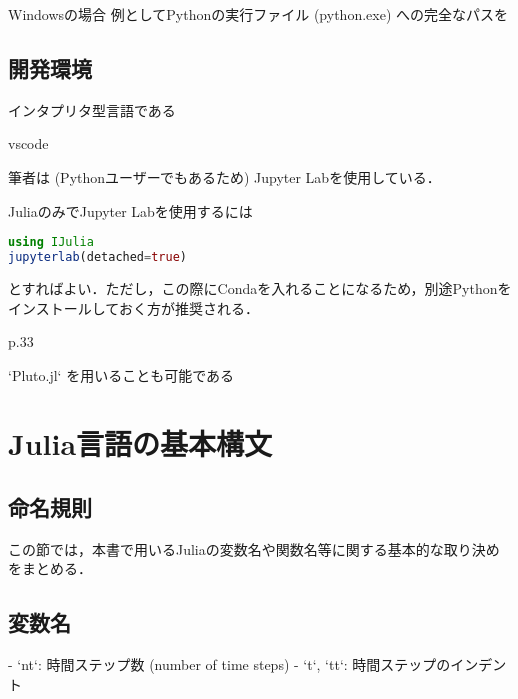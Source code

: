 \documentclass[titlepage]{ltjsbook}
\begin{document}
Windowsの場合
例としてPythonの実行ファイル (python.exe) への完全なパスを


\subsection{開発環境}

インタプリタ型言語である

vscode

筆者は (Pythonユーザーでもあるため) Jupyter Labを使用している．

JuliaのみでJupyter Labを使用するには

\begin{lstlisting}[language=julia]
using IJulia
jupyterlab(detached=true)
\end{lstlisting}

とすればよい．ただし，この際にCondaを入れることになるため，別途Pythonをインストールしておく方が推奨される．

p.33

`Pluto.jl` を用いることも可能である

\section{Julia言語の基本構文}


\subsection{命名規則}
この節では，本書で用いるJuliaの変数名や関数名等に関する基本的な取り決めをまとめる．

\subsection{変数名}
- `nt`: 時間ステップ数 (number of time steps)
- `t`, `tt`: 時間ステップのインデント

\printbibliography[segment=\therefsegment,heading=subbibliography,title={参考文献}]
\end{document}
